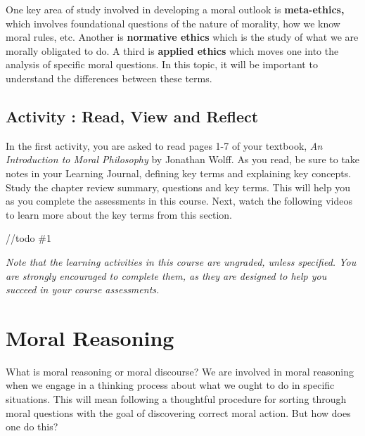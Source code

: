 \documentclass[
]{book}
\begin{document}
One key area of study involved in developing a moral outlook is \textbf{meta-ethics,} which involves foundational questions of the nature of morality, how we know moral rules, etc. Another is \textbf{normative ethics} which is the study of what we are morally obligated to do. A third is \textbf{applied ethics} which moves one into the analysis of specific moral questions. In this topic, it will be important to understand the differences between these terms.

\begin{reflect}
\hypertarget{activity-read-view-and-reflect}{%
\subsection*{Activity : Read, View and Reflect}\label{activity-read-view-and-reflect}}

In the first activity, you are asked to read pages 1-7 of your textbook, \emph{An Introduction to Moral Philosophy} by Jonathan Wolff. As you read, be sure to take notes in your Learning Journal, defining key terms and explaining key concepts. Study the chapter review summary, questions and key terms. This will help you as you complete the assessments in this course.
Next, watch the following videos to learn more about the key terms from this section.

//todo \#1
\end{reflect}

\begin{caution}
\emph{Note that the learning activities in this course are ungraded, unless specified. You are strongly encouraged to complete them, as they are designed to help you succeed in your course assessments.}
\end{caution}

\hypertarget{moral-reasoning}{%
\section*{Moral Reasoning}\label{moral-reasoning}}

What is moral reasoning or moral discourse? We are involved in moral reasoning
when we engage in a thinking process about what we ought to do in specific
situations. This will mean following a thoughtful procedure for sorting through
moral questions with the goal of discovering correct moral action. But how does
one do this?
\end{document}
